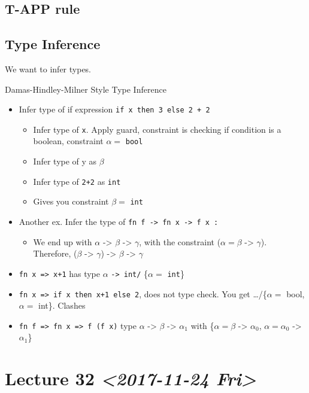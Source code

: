 \documentclass[11pt]{article}
\begin{document}
\subsection{T-APP rule}
\label{sec:org3cd44e1}
\subsection{Type Inference}
\label{sec:org51c4842}
We want to infer types.

Damas-Hindley-Milner Style Type Inference

\begin{itemize}
\item Infer type of if expression \texttt{if x then 3 else 2 + 2}
\begin{itemize}
\item Infer type of \texttt{x}. Apply guard, constraint is checking if condition is a boolean, constraint \(\alpha=\) \texttt{bool}
\item Infer type of y as \(\beta\)
\item Infer type of \texttt{2+2} as \texttt{int}
\item Gives you constraint \(\beta=\) \texttt{int}
\end{itemize}
\item Another ex. Infer the type of \texttt{fn f -> fn x -> f x :}
\begin{itemize}
\item We end up with \(\alpha\) -> \(\beta\) -> \(\gamma\), with the constraint (\(\alpha = \beta\) -> \(\gamma\)). Therefore, (\(\beta\) -> \(\gamma\)) -> \(\beta\) -> \(\gamma\)
\end{itemize}
\item \texttt{fn x => x+1} has type \(\alpha\) \texttt{-> int/} \{\(\alpha =\) \texttt{int}\}
\item \texttt{fn x => if x then x+1 else 2}, does not type check. You get \ldots/\{\(\alpha =\) bool, \(\alpha=\) int\}. Clashes
\item \texttt{fn f => fn x => f (f x)} type \(\alpha\) -> \(\beta\) -> \(\alpha_1\) with \{\(\alpha = \beta\) -> \(\alpha_0\), \(\alpha = \alpha_0\) -> \(\alpha_1\)\}
\end{itemize}
\section{Lecture 32 \textit{<2017-11-24 Fri>}}
\label{sec:org3732647}
\end{document}
